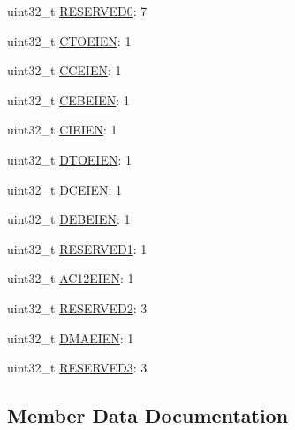 \begin{DoxyCompactItemize}
uint32\+\_\+t \hyperlink{struct__hw__sdhc__irqsigen_1_1__hw__sdhc__irqsigen__bitfields_ab45f3e17ac63fcfde460ab4052ff3cb2}{R\+E\+S\+E\+R\+V\+E\+D0}\+: 7
\item 
uint32\+\_\+t \hyperlink{struct__hw__sdhc__irqsigen_1_1__hw__sdhc__irqsigen__bitfields_a8c8ea6cd7f667569c7585ca262624ad5}{C\+T\+O\+E\+I\+EN}\+: 1
\item 
uint32\+\_\+t \hyperlink{struct__hw__sdhc__irqsigen_1_1__hw__sdhc__irqsigen__bitfields_af410543d52d3f6e7b90bdfb3308d14e0}{C\+C\+E\+I\+EN}\+: 1
\item 
uint32\+\_\+t \hyperlink{struct__hw__sdhc__irqsigen_1_1__hw__sdhc__irqsigen__bitfields_a41f934b13d6bfdace8c1fdb1d4ef3ddf}{C\+E\+B\+E\+I\+EN}\+: 1
\item 
uint32\+\_\+t \hyperlink{struct__hw__sdhc__irqsigen_1_1__hw__sdhc__irqsigen__bitfields_a4b76b220c5e51663c5176613782e1b88}{C\+I\+E\+I\+EN}\+: 1
\item 
uint32\+\_\+t \hyperlink{struct__hw__sdhc__irqsigen_1_1__hw__sdhc__irqsigen__bitfields_aa62a953d5c22b2fa1783848d64686d1e}{D\+T\+O\+E\+I\+EN}\+: 1
\item 
uint32\+\_\+t \hyperlink{struct__hw__sdhc__irqsigen_1_1__hw__sdhc__irqsigen__bitfields_ad611410f9b0d2f49b69adc14465b5b29}{D\+C\+E\+I\+EN}\+: 1
\item 
uint32\+\_\+t \hyperlink{struct__hw__sdhc__irqsigen_1_1__hw__sdhc__irqsigen__bitfields_a7be1c77598d46f33c03145e8f1df6d34}{D\+E\+B\+E\+I\+EN}\+: 1
\item 
uint32\+\_\+t \hyperlink{struct__hw__sdhc__irqsigen_1_1__hw__sdhc__irqsigen__bitfields_a196dcddff98bc37a340b9d56310ab436}{R\+E\+S\+E\+R\+V\+E\+D1}\+: 1
\item 
uint32\+\_\+t \hyperlink{struct__hw__sdhc__irqsigen_1_1__hw__sdhc__irqsigen__bitfields_ab3f66b983d2d7da1c79ce47b88968cb0}{A\+C12\+E\+I\+EN}\+: 1
\item 
uint32\+\_\+t \hyperlink{struct__hw__sdhc__irqsigen_1_1__hw__sdhc__irqsigen__bitfields_adad4ccc754f7e0c3b35763f3515096d6}{R\+E\+S\+E\+R\+V\+E\+D2}\+: 3
\item 
uint32\+\_\+t \hyperlink{struct__hw__sdhc__irqsigen_1_1__hw__sdhc__irqsigen__bitfields_a804f120dcc31d3220421d069a54cd46f}{D\+M\+A\+E\+I\+EN}\+: 1
\item 
uint32\+\_\+t \hyperlink{struct__hw__sdhc__irqsigen_1_1__hw__sdhc__irqsigen__bitfields_a13b4fac5bfdc45b864e642eacc46d015}{R\+E\+S\+E\+R\+V\+E\+D3}\+: 3
\end{DoxyCompactItemize}


\subsection{Member Data Documentation}
